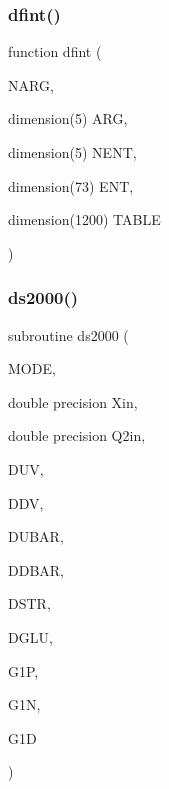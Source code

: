 \mbox{\label{polpdf_8f_ab97fb05f575804d70f2f4cc11b7a6396}} 
\subsubsection{\texorpdfstring{dfint()}{dfint()}}
{\footnotesize\ttfamily function dfint (\begin{DoxyParamCaption}\item[{}]{N\+A\+RG,  }\item[{dimension(5)}]{A\+RG,  }\item[{dimension(5)}]{N\+E\+NT,  }\item[{dimension(73)}]{E\+NT,  }\item[{dimension(1200)}]{T\+A\+B\+LE }\end{DoxyParamCaption})}

\mbox{\label{polpdf_8f_ac537a7e2b44b985b2c5e2083c9fa7742}} 
\subsubsection{\texorpdfstring{ds2000()}{ds2000()}}
{\footnotesize\ttfamily subroutine ds2000 (\begin{DoxyParamCaption}\item[{}]{M\+O\+DE,  }\item[{double precision}]{Xin,  }\item[{double precision}]{Q2in,  }\item[{}]{D\+UV,  }\item[{}]{D\+DV,  }\item[{}]{D\+U\+B\+AR,  }\item[{}]{D\+D\+B\+AR,  }\item[{}]{D\+S\+TR,  }\item[{}]{D\+G\+LU,  }\item[{}]{G1P,  }\item[{}]{G1N,  }\item[{}]{G1D }\end{DoxyParamCaption})}

\mbox{\label{polpdf_8f_afd1d368d6ebb9dd0fcff81eb028cc399}} 
